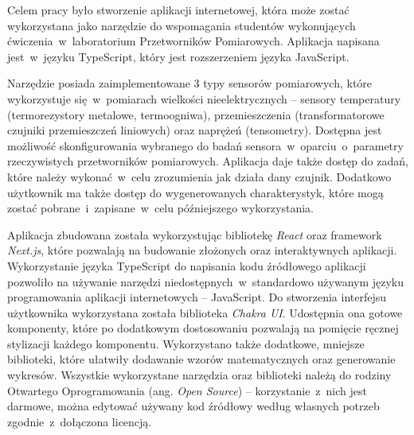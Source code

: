 Celem pracy było stworzenie aplikacji internetowej, która może zostać wykorzystana jako narzędzie do
wspomagania studentów wykonujących ćwiczenia~w~laboratorium Przetworników Pomiarowych. Aplikacja
napisana jest~w~języku TypeScript, który jest rozszerzeniem języka JavaScript.

Narzędzie posiada zaimplementowane 3 typy sensorów pomiarowych, które wykorzystuje się~w~pomiarach
wielkości nieelektrycznych -- sensory temperatury (termorezystory metalowe, termoogniwa),
przemieszczenia (transformatorowe czujniki przemieszczeń liniowych) oraz naprężeń
(tensometry). Dostępna jest możliwość skonfigurowania wybranego do badań
sensora~w~oparciu~o~parametry rzeczywistych przetworników pomiarowych. Aplikacja daje także dostęp
do zadań, które należy wykonać~w~celu zrozumienia jak działa dany czujnik. Dodatkowo użytkownik ma
także dostęp do wygenerowanych charakterystyk, które mogą zostać pobrane~i~zapisane~w~celu
późniejszego wykorzystania.

Aplikacja zbudowana została wykorzystując bibliotekę \textit{React} oraz framework \textit{Next.js},
które pozwalają na budowanie złożonych oraz interaktywnych aplikacji. Wykorzystanie języka
TypeScript do napisania kodu źródłowego aplikacji pozwoliło na używanie narzędzi
niedostępnych~w~standardowo używanym języku programowania aplikacji internetowych -- JavaScript. Do
stworzenia interfejsu użytkownika wykorzystana została biblioteka \textit{Chakra UI}. Udostępnia ona
gotowe komponenty, które po dodatkowym dostosowaniu pozwalają na pomięcie ręcznej stylizacji każdego
komponentu. Wykorzystano także dodatkowe, mniejsze biblioteki, które ułatwiły dodawanie wzorów
matematycznych oraz generowanie wykresów. Wszystkie wykorzystane narzędzia oraz biblioteki należą do
rodziny Otwartego Oprogramowania (ang. \textit{Open Source}) -- korzystanie~z~nich jest darmowe,
można edytować używany kod źródłowy według własnych potrzeb zgodnie~z~dołączona licencją.
